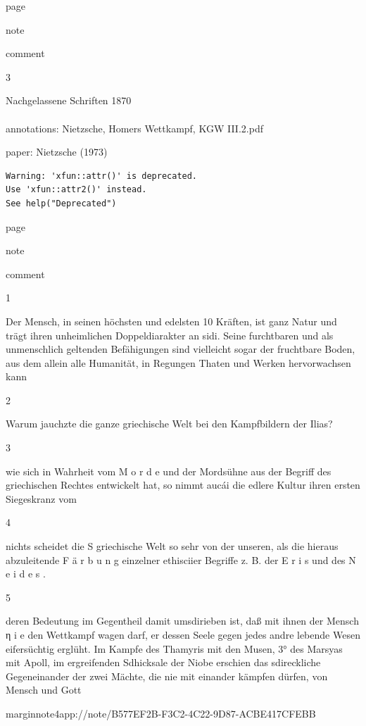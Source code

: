 \documentclass[
  letterpaper,
  DIV=11,
  numbers=noendperiod]{scrartcl}
\makeatletter
\let\oldparagraph\paragraph
\renewcommand{\paragraph}{
    \@ifstar
      \xxxParagraphStar
      \xxxParagraphNoStar
  }
\newcommand{\xxxParagraphStar}[1]{\oldparagraph*{#1}\mbox{}}
\newcommand{\xxxParagraphNoStar}[1]{\oldparagraph{#1}\mbox{}}
\makeatother
\begin{document}
page

note

comment

3

Nachgelassene Schriften 1870

\paragraph{annotations: Nietzsche, Homers Wettkampf, KGW
III.2.pdf}\label{annotations-nietzsche-homers-wettkampf-kgw-iii.2.pdf}

paper: Nietzsche (1973)

\begin{verbatim}
Warning: 'xfun::attr()' is deprecated.
Use 'xfun::attr2()' instead.
See help("Deprecated")
\end{verbatim}

page

note

comment

1

Der Mensch, in seinen höchsten und edelsten 10 Kräften, ist ganz Natur
und trägt ihren unheimlichen Doppeldiarakter an sidi. Seine furchtbaren
und als unmenschlich geltenden Befähigungen sind vielleicht sogar der
fruchtbare Boden, aus dem allein alle Humanität, in Regungen Thaten und
Werken hervorwachsen kann

2

Warum jauchzte die ganze griechische Welt bei den Kampfbildern der
Ilias?

3

wie sich in Wahrheit vom M o r d e und der Mordsühne aus der Begriff des
griechischen Rechtes entwickelt hat, so nimmt aucái die edlere Kultur
ihren ersten Siegeskranz vom

4

nichts scheidet die S griechische Welt so sehr von der unseren, als die
hieraus abzuleitende F ä r b u n g einzelner ethisciier Begriffe z. B.
der E r i s und des N e i d e s .

5

deren Bedeutung im Gegentheil damit umsdirieben ist, daß mit ihnen der
Mensch η i e den Wettkampf wagen darf, er dessen Seele gegen jedes andre
lebende Wesen eifersüchtig erglüht. Im Kampfe des Thamyris mit den
Musen, 3° des Marsyas mit Apoll, im ergreifenden Sdhicksale der Niobe
erschien das sdireckliche Gegeneinander der zwei Mächte, die nie mit
einander kämpfen dürfen, von Mensch und Gott

marginnote4app://note/B577EF2B-F3C2-4C22-9D87-ACBE417CFEBB
\end{document}
